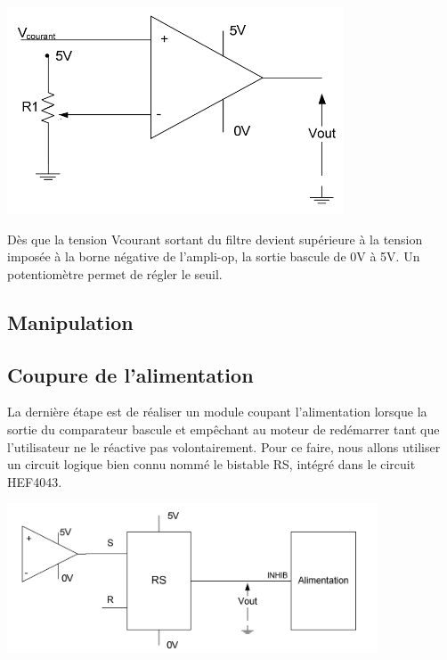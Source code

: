 \documentclass{../template/labo}
\begin{document}
\begin{center}
\includegraphics[width=10cm]{sch8}
\end{center}

Dès que la tension Vcourant sortant du filtre devient supérieure à la tension imposée à la borne négative
de l'ampli-op, la sortie bascule de 0V à 5V. Un potentiomètre permet de régler le seuil.

\subsection{Manipulation}




\subsection{Coupure de l'alimentation}

La dernière étape est de réaliser un module coupant l'alimentation lorsque la sortie du comparateur
bascule et empêchant au moteur de redémarrer tant que l'utilisateur ne le réactive pas volontairement.
Pour ce faire, nous allons utiliser un circuit logique bien connu nommé le bistable RS, intégré dans le
circuit HEF4043.

\begin{center}
\includegraphics[width=11cm]{sch9}
\end{center}
\end{document}

